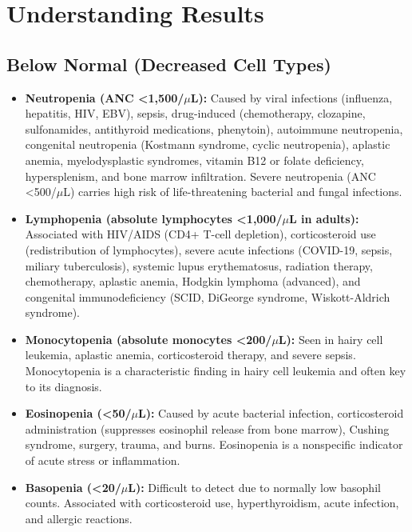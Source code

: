 \section*{Understanding Results}

\subsection*{Below Normal (Decreased Cell Types)}
\begin{itemize}
  \item \textbf{Neutropenia (ANC <1,500/$\mu$L):} Caused by viral infections (influenza, hepatitis, HIV, EBV), sepsis, drug-induced (chemotherapy, clozapine, sulfonamides, antithyroid medications, phenytoin), autoimmune neutropenia, congenital neutropenia (Kostmann syndrome, cyclic neutropenia), aplastic anemia, myelodysplastic syndromes, vitamin B12 or folate deficiency, hypersplenism, and bone marrow infiltration. Severe neutropenia (ANC <500/$\mu$L) carries high risk of life-threatening bacterial and fungal infections.
  \item \textbf{Lymphopenia (absolute lymphocytes <1,000/$\mu$L in adults):} Associated with HIV/AIDS (CD4+ T-cell depletion), corticosteroid use (redistribution of lymphocytes), severe acute infections (COVID-19, sepsis, miliary tuberculosis), systemic lupus erythematosus, radiation therapy, chemotherapy, aplastic anemia, Hodgkin lymphoma (advanced), and congenital immunodeficiency (SCID, DiGeorge syndrome, Wiskott-Aldrich syndrome).
  \item \textbf{Monocytopenia (absolute monocytes <200/$\mu$L):} Seen in hairy cell leukemia, aplastic anemia, corticosteroid therapy, and severe sepsis. Monocytopenia is a characteristic finding in hairy cell leukemia and often key to its diagnosis.
  \item \textbf{Eosinopenia (<50/$\mu$L):} Caused by acute bacterial infection, corticosteroid administration (suppresses eosinophil release from bone marrow), Cushing syndrome, surgery, trauma, and burns. Eosinopenia is a nonspecific indicator of acute stress or inflammation.
  \item \textbf{Basopenia (<20/$\mu$L):} Difficult to detect due to normally low basophil counts. Associated with corticosteroid use, hyperthyroidism, acute infection, and allergic reactions.
\end{itemize}

